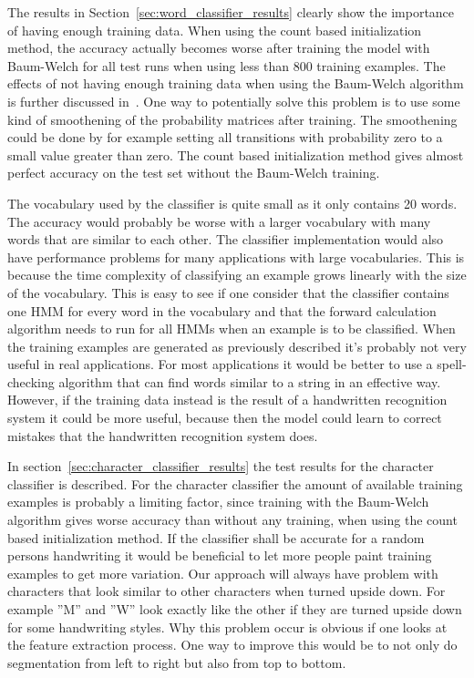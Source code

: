 The results in Section~\ref{sec:word_classifier_results} clearly show the importance of having enough training data.
When using the count based initialization method, the accuracy actually becomes worse after training the model with Baum-Welch for all test runs when using less than 800 training examples.
The effects of not having enough training data when using the Baum-Welch algorithm is further discussed in~\cite{Rabiner1989}.
One way to potentially solve this problem is to use some kind of smoothening of the probability matrices after training.
The smoothening could be done by for example setting all transitions with probability zero to a small value greater than zero.
The count based initialization method gives almost perfect accuracy on the test set without the Baum-Welch training.

The vocabulary used by the classifier is quite small as it only contains 20 words.
The accuracy would probably be worse with a larger vocabulary with many words that are similar to each other.
The classifier implementation would also have performance problems for many applications with large vocabularies.
This is because the time complexity of classifying an example grows linearly with the size of the vocabulary.
This is easy to see if one consider that the classifier contains one HMM for every word in the vocabulary and that the forward calculation algorithm needs to run for all HMMs when an example is to be classified.
When the training examples are generated as previously described it's probably not very useful in real applications.
For most applications it would be better to use a spell-checking algorithm that can find words similar to a string in an effective way.
However, if the training data instead is the result of a handwritten recognition system it could be more useful, because then the model could learn to correct mistakes that the handwritten recognition system does.

In section~\ref{sec:character_classifier_results} the test results for the character classifier is described.
For the character classifier the amount of available training examples is probably a limiting factor, since training with the Baum-Welch algorithm gives worse accuracy than without any training, when using the count based initialization method.
If the classifier shall be accurate for a random persons handwriting it would be beneficial to let more people paint training examples to get more variation.
Our approach will always have problem with characters that look similar to other characters when turned upside down.
For example ''M'' and ''W'' look exactly like the other if they are turned upside down for some handwriting styles.
Why this problem occur is obvious if one looks at the feature extraction process.
One way to improve this would be to not only do segmentation from left to right but also from top to bottom.
